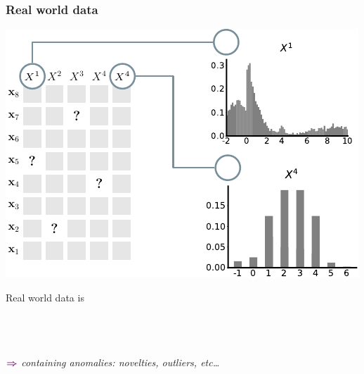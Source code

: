 \documentclass[xcolor={usenames,dvipsnames,svgnames}, compress, aspectratio=169, 11pt]{beamer}
\newcommand{\comment}[3][\small]{\begin{minipage}{1\linewidth}
          \raggedleft
          {
            $\color{violet}\boldsymbol\Rightarrow$
            #1
            {\emph{#2}}
          }
      \end{minipage}#3\\
}
\begin{document}
\begin{frame}[t, htt=bgrey2]
  \frametitle{Real world data}

  \large
  \begin{minipage}[t]{0.6\linewidth}
    \includegraphics[width=.99\linewidth]{figures/abda-miss-hist-type}
  \end{minipage}\hfill\begin{minipage}[t]{0.3\linewidth}
    \vspace{-150pt}
    { Real world data is}\\[5pt]
    \\
    \\
    \\
    \comment[\normalsize]{containing anomalies: novelties, outliers, etc\dots}{}\\
  \end{minipage}  
\end{frame}
\end{document}
